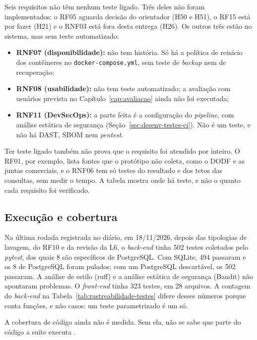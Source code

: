Seis requisitos não têm nenhum teste ligado. Três deles não foram
implementados: o RF05 aguarda decisão do orientador (H50 e H51), o RF15 está
por fazer (H21) e o RNF03 está fora desta entrega (H26). Os outros três estão
no sistema, mas sem teste automatizado:
\begin{itemize}
	\item \textbf{RNF07 (disponibilidade):} não tem história. Só há a política
	de reinício dos contêineres no \texttt{docker-compose.yml}, sem teste de
	\textit{backup} nem de recuperação;
	\item \textbf{RNF08 (usabilidade):} não tem teste automatizado; a
	avaliação com usuários prevista no Capítulo~\ref{cap:avaliacao} ainda não
	foi executada;
	\item \textbf{RNF11 (DevSecOps):} a parte feita é a configuração do
	\textit{pipeline}, com análise estática de segurança
	(Seção~\ref{sec:desenv-testes-ci}). Não é um teste, e não há DAST, SBOM
	nem \textit{pentest}.
\end{itemize}
Ter teste ligado também não prova que o requisito foi atendido por inteiro.
O RF01, por exemplo, lista fontes que o protótipo não coleta, como o DODF e
as juntas comerciais, e o RNF06 tem só testes do resultado e dos tetos das
consultas, sem medir o tempo.
A tabela mostra onde há teste, e não o quanto cada requisito foi verificado.

\subsection{Execução e cobertura}
\label{sec:desenv-testes-execucao}

Na última rodada registrada no diário, em 18/11/2026, depois das
tipologias de lavagem, do RF10 e da revisão da L6, o \textit{back-end} tinha 502 testes
coletados pelo \textit{pytest}, dos quais 8 são específicos de PostgreSQL.
Com SQLite, 494 passaram e os 8 de PostgreSQL foram pulados; com um
PostgreSQL descartável, os 502 passaram. A análise de estilo (ruff) e a
análise estática de segurança (Bandit) não apontaram problemas. O
\textit{front-end} tinha 323 testes, em 28 arquivos. A contagem do
\textit{back-end} na Tabela~\ref{tab:rastreabilidade-testes} difere desses
números porque conta funções, e não casos: um teste parametrizado é um
só.

A cobertura de código ainda não é medida. Sem ela, não se sabe que parte do
código a suíte executa \cite[cap.~5, seç.~4]{swebok4}.

